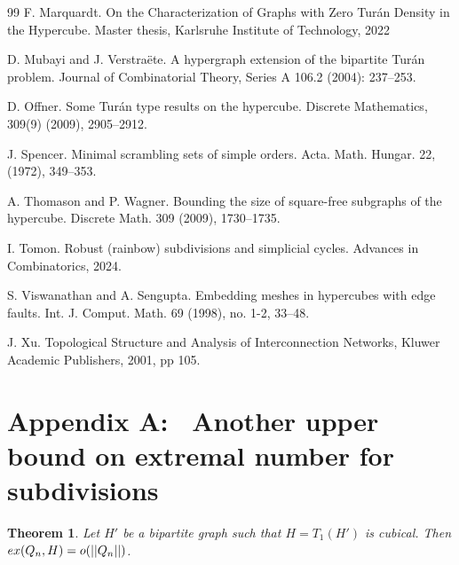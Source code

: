 \documentclass[11pt, a4paper]{article}
\newtheorem{theorem}{Theorem}
\newcommand{\ex}{{\rm  ex}}
\begin{document}
\begin{thebibliography}{99}
 F. Marquardt.
\newblock On the Characterization of
Graphs with Zero Tur\'an Density in the Hypercube.  Master thesis, Karlsruhe Institute of Technology, 2022

D. Mubayi and J. Verstra\"ete.
\newblock A hypergraph extension of the bipartite Tur\' an problem. 
Journal of  Combinatorial Theory, Series A 106.2 (2004): 237--253.

D. Offner.
\newblock Some Tur\'an type results on the hypercube. 
Discrete Mathematics, 309(9) (2009), 2905--2912.


 J. Spencer.
\newblock Minimal scrambling sets of simple orders.
Acta. Math. Hungar. 22, (1972), 349--353.



A. Thomason and P. Wagner.
\newblock Bounding the size of square-free subgraphs of the hypercube.
Discrete Math. 309 (2009), 1730--1735.

 I. Tomon.
\newblock  Robust (rainbow) subdivisions and simplicial cycles.
Advances in Combinatorics, 2024.

  S. Viswanathan and A.  Sengupta.   Embedding meshes in hypercubes with edge faults. Int. J. Comput. Math. 69 (1998), no. 1-2, 33--48.


 J. Xu. Topological Structure and Analysis of Interconnection Networks, Kluwer Academic Publishers, 2001, pp 105.



\end{thebibliography}




\section{Appendix A:~  Another upper bound on extremal number for subdivisions}

\begin{theorem}
Let  $H'$ be a bipartite graph such that  $H=T_{1}(H')$ is cubical. Then $\ex(Q_n, H)= o(||Q_n||)$. 
\end{theorem}
\end{document}
